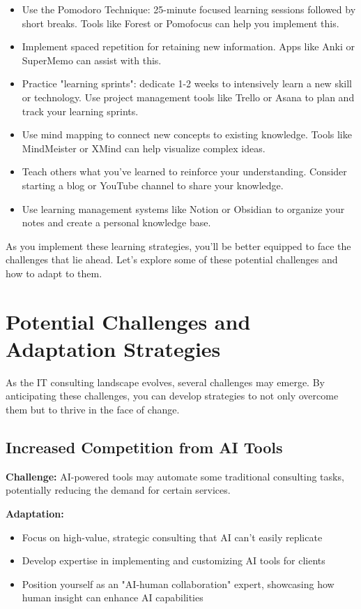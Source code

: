\begin{itemize}
    \item Use the Pomodoro Technique: 25-minute focused learning sessions followed by short breaks. Tools like Forest or Pomofocus can help you implement this.
    \item Implement spaced repetition for retaining new information. Apps like Anki or SuperMemo can assist with this.
    \item Practice "learning sprints": dedicate 1-2 weeks to intensively learn a new skill or technology. Use project management tools like Trello or Asana to plan and track your learning sprints.
    \item Use mind mapping to connect new concepts to existing knowledge. Tools like MindMeister or XMind can help visualize complex ideas.
    \item Teach others what you've learned to reinforce your understanding. Consider starting a blog or YouTube channel to share your knowledge.
    \item Use learning management systems like Notion or Obsidian to organize your notes and create a personal knowledge base.
\end{itemize}
%
As you implement these learning strategies, you'll be better equipped to face the challenges that lie ahead. Let's explore some of these potential challenges and how to adapt to them.

\section{Potential Challenges and Adaptation Strategies}

As the IT consulting landscape evolves, several challenges may emerge. By anticipating these challenges, you can develop strategies to not only overcome them but to thrive in the face of change.

\subsection{Increased Competition from AI Tools}

\textbf{Challenge:} AI-powered tools may automate some traditional consulting tasks, potentially reducing the demand for certain services.

\textbf{Adaptation:}
\begin{itemize}
    \item Focus on high-value, strategic consulting that AI can't easily replicate
    \item Develop expertise in implementing and customizing AI tools for clients
    \item Position yourself as an "AI-human collaboration" expert, showcasing how human insight can enhance AI capabilities
\end{itemize}
%
